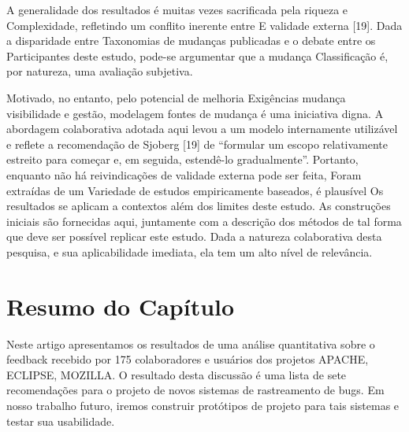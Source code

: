 A generalidade dos resultados é muitas vezes sacrificada pela riqueza e
Complexidade, refletindo um conflito inerente entre E validade externa [19].
Dada a disparidade entre Taxonomias de mudanças publicadas e o debate entre os
Participantes deste estudo, pode-se argumentar que a mudança Classificação é,
por natureza, uma avaliação subjetiva.

Motivado, no entanto, pelo potencial de melhoria Exigências mudança visibilidade
e gestão, modelagem fontes de mudança é uma iniciativa digna. A abordagem
colaborativa adotada aqui levou a um modelo internamente utilizável e reflete a
recomendação de Sjoberg [19] de ``formular um escopo relativamente estreito para
começar e, em seguida, estendê-lo gradualmente''. Portanto, enquanto não há
reivindicações de validade externa pode ser feita, Foram extraídas de um
Variedade de estudos empiricamente baseados, é plausível Os resultados se
aplicam a contextos além dos limites deste estudo. As construções iniciais são
fornecidas aqui, juntamente com a descrição dos métodos de tal forma que deve
ser possível replicar este estudo. Dada a natureza colaborativa desta pesquisa,
e sua aplicabilidade imediata, ela tem um alto nível de relevância.

\section{Resumo do Capítulo}
\label{sec:resumo_do_capitulo}
Neste artigo apresentamos os resultados de uma análise quantitativa sobre o
feedback recebido por 175 colaboradores e usuários dos projetos APACHE, ECLIPSE,
MOZILLA\@. O resultado desta discussão é uma lista de sete recomendações para o
projeto de novos sistemas de rastreamento de bugs. Em nosso trabalho futuro,
iremos construir protótipos de projeto para tais sistemas e testar sua
usabilidade.
